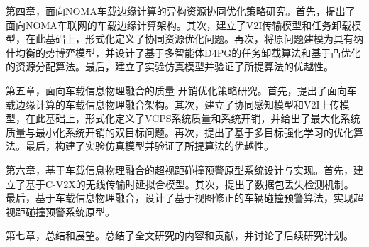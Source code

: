 第四章，面向NOMA车载边缘计算的异构资源协同优化策略研究。首先，提出了面向NOMA车联网的车载边缘计算架构。其次，建立了V2I传输模型和任务卸载模型，在此基础上，形式化定义了协同资源优化问题。再次，将原问题建模为具有纳什均衡的势博弈模型，并设计了基于多智能体D4PG的任务卸载算法和基于凸优化的资源分配算法。最后，建立了实验仿真模型并验证了所提算法的优越性。

第五章，面向车载信息物理融合的质量-开销优化策略研究。首先，提出了面向车载边缘计算的车载信息物理融合架构。其次，建立了协同感知模型和V2I上传模型，在此基础上，形式化定义了VCPS系统质量和系统开销，并给出了最大化系统质量与最小化系统开销的双目标问题。再次，提出了基于多目标强化学习的优化算法。最后，构建了实验仿真模型并验证了所提算法的优越性。

第六章，基于车载信息物理融合的超视距碰撞预警原型系统设计与实现。首先，建立了基于C-V2X的无线传输时延拟合模型。其次，提出了数据包丢失检测机制。最后，基于车载信息物理融合，设计了基于视图修正的车辆碰撞预警算法，实现超视距碰撞预警系统原型。

第七章，总结和展望。总结了全文研究的内容和贡献，并讨论了后续研究计划。







